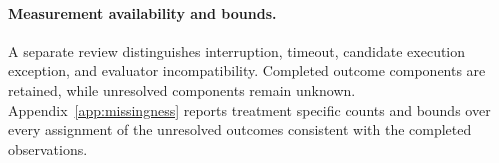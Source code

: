 \paragraph{Measurement availability and bounds.}
A separate review distinguishes interruption, timeout, candidate execution exception, and evaluator incompatibility. Completed outcome components are retained, while unresolved components remain unknown. Appendix~\ref{app:missingness} reports treatment specific counts and bounds over every assignment of the unresolved outcomes consistent with the completed observations.
